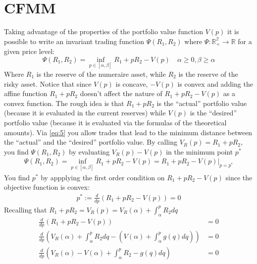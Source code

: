 \documentclass[12pt]{article}
\begin{document}
\section{CFMM}
Taking advantage of the properties of the portfolio value function $V(p)$ it is possible to write an invariant trading function $\Psi(R_1,R_2)$ where $\Psi: \mathbb{R^\text{2}_+}\rightarrow\mathbb{R}$ for a given price level:
\begin{equation}
    \Psi(R_1,R_2) = \inf_{p\in[\alpha,\beta]} R_1 + pR_2 -V(p) \quad \alpha\geq 0, \beta \geq \alpha \label{eq:5}
\end{equation}
Where $R_1$ is the reserve of the numeraire asset, while $R_2$ is the reserve of the risky asset. \newline
Notice that since $V(p)$ is concave, $-V(p)$ is convex and adding the affine function $R_1 +pR_2$ doesn't affect the nature of $R_1 +pR_2 -V(p)$ as a convex function. \newline
The rough idea is that $R_1 + pR_2$ is the ``actual'' portfolio value (because it is evaluated in the current reserves) while $V(p)$ is the ``desired'' portfolio value (because it is evaluated via the formulas of the theoretical amounts). \newline
Via \eqref{eq:5} you allow trades that lead to the minimum distance between the ``actual'' and the ``desired'' portfolio value. \newline
\newline
By calling $V_R(p)=R_1 + pR_2$, you find $\Psi(R_1,R_2)$ by evaluating $V_R(p)-V(p)$ in the minimum point $p^*$
\begin{align*}
    \Psi(R_1,R_2) = \inf_{p\in[\alpha,\beta]} R_1 + pR_2 -V(p) = R_1 + pR_2 -V(p)|_{p=p^*}
\end{align*}
You find $p^*$ by appplying the first order condition on $R_1 + pR_2 -V(p)$ since the objective function is convex:
\begin{align*}
    p^*:=\frac{d}{dp} \left(R_1 + pR_2 -V(p)\right) = 0
\end{align*}
Recalling that $R_1 + pR_2 = V_R(p)=V_R(\alpha) + \int_{\alpha}^p R_2 dq$
\begin{align*}
    \frac{d}{dp} \left(R_1 + pR_2 -V(p)\right)                                                                      & = 0 \\
    \frac{d}{dp} \left(V_R(\alpha) + \int_{\alpha}^p R_2 dq -\left(V(\alpha)+\int_{\alpha}^{p}g(q)dq\right) \right) & = 0 \\
    \frac{d}{dp} \left(V_R(\alpha) -V(\alpha) + \int_{\alpha}^p R_2 -g(q) dq  \right)                               & = 0 \\
\end{align*}
\end{document}

